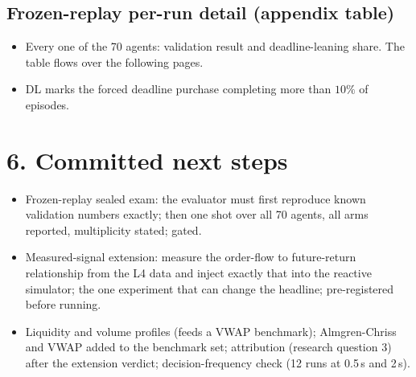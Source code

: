 \documentclass[11pt]{article}
\begin{document}
\clearpage
\subsection*{Frozen-replay per-run detail (appendix table)}
\begin{itemize}
\item Every one of the 70 agents: validation result and deadline-leaning share. The table
flows over the following pages.
\item DL marks the forced deadline purchase completing more than $10\%$ of episodes.
\end{itemize}
\begin{center}\scriptsize\end{center}
\clearpage

\section*{6. Committed next steps}
\begin{itemize}
\item Frozen-replay sealed exam: the evaluator must first reproduce known validation numbers
exactly; then one shot over all 70 agents, all arms reported, multiplicity stated; gated.
\item Measured-signal extension: measure the order-flow to future-return relationship from
the L4 data and inject exactly that into the reactive simulator; the one experiment that can
change the headline; pre-registered before running.
\item Liquidity and volume profiles (feeds a VWAP benchmark); Almgren-Chriss and VWAP added
to the benchmark set; attribution (research question 3) after the extension verdict;
decision-frequency check (12 runs at 0.5\,s and 2\,s).
\end{itemize}
\end{document}
